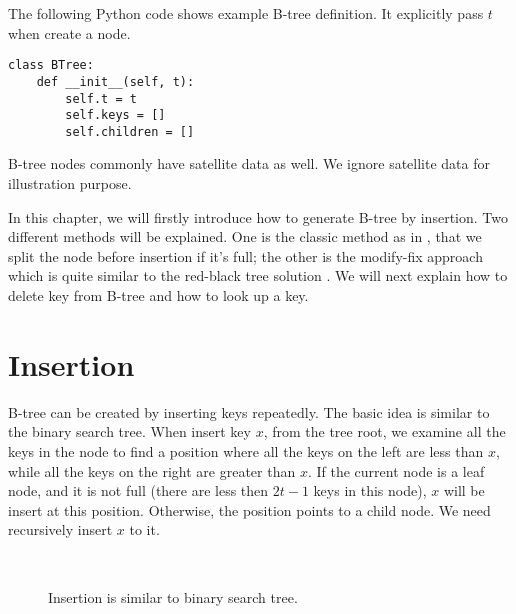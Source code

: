 \documentclass{article}
\begin{document}
The following Python code shows example B-tree definition.
It explicitly pass $t$ when create a node.

\lstset{language=Python}
\begin{lstlisting}
class BTree:
    def __init__(self, t):
        self.t = t
        self.keys = []
        self.children = []
\end{lstlisting}

B-tree nodes commonly have satellite data as well. We ignore
satellite data for illustration purpose.

In this chapter, we will firstly introduce how to generate B-tree by insertion.
Two different methods will be explained. One is the classic method
as in \cite{CLRS}, that we split the node before insertion if it's full;
the other is the modify-fix approach which is quite similar to the
red-black tree solution \cite{okasaki-rbtree} \cite{wiki-b-tree}.
We will next explain how to delete
key from B-tree and how to look up a key.


\section{Insertion}
\label{btree-insertion}

B-tree can be created by inserting
keys repeatedly. The basic idea is similar to the binary
search tree. When insert key $x$, from the tree root, we examine all the
keys in the node to find a position where all the keys on the left are
less than $x$, while all the keys on the right are greater than $x$.
If the current node is a leaf node, and it is not full (there are
less then $2t-1$ keys in this node), $x$ will be insert at this position.
Otherwise, the position points to a child node.
We need recursively insert $x$ to it.

\begin{figure}[htbp]
  \centering
   \\
  \caption{Insertion is similar to binary search tree.} \label{fig:btree-insert-simple}
\end{figure}
\end{document}
